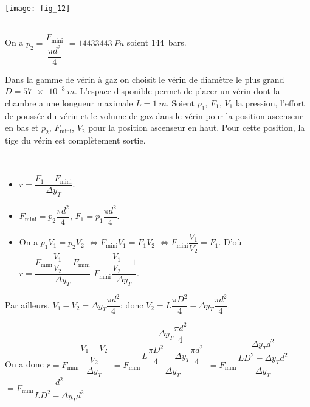 \ifprof
\else
\begin{marginfigure}
\texttt{[image: fig\_12]}
\end{marginfigure}
\fi

\ifprof
\begin{corrige}~\\
On a $p_2 = \dfrac{F_{\text{mini}}}{\dfrac{\pi d^2}{4}}$ $=\SI{14433443}{Pa}$ soient \SI{144}{bars}.
\end{corrige}
\else
\fi

\ifprof
\else
Dans la gamme de vérin à gaz on choisit le vérin de diamètre le plus grand
$D=\SI{57e-3}{m}$. L’espace disponible permet de placer un vérin dont la chambre
a une longueur maximale $L=\SI{1}{m}$. Soient $p_1$, $F_1$, $V_1$ la pression,
l’effort de poussée du vérin et le volume de gaz dans le vérin pour la position
ascenseur en bas et $p_2$, $F_{\text{mini}}$, $V_2$ pour la position ascenseur en haut. Pour cette
position, la tige du vérin est complètement sortie.
\fi


\ifprof
\begin{corrige}~\\
\begin{itemize}
\item $r=\dfrac{F_1-F_{\text{mini}}}{\Delta y_T}$.
\item $F_{\text{mini}}=p_2\dfrac{\pi d^2}{4}$, $F_1=p_1\dfrac{\pi d^2}{4}$.
\item On a $p_1 V_1 = p_2 V_2$  $\Leftrightarrow F_{\text{mini}} V_1 = F_1 V_2$ $\Leftrightarrow F_{\text{mini}} \dfrac{V_1}{V_2} = F_1$. D'où $r=\dfrac{F_{\text{mini}} \dfrac{V_1}{V_2}-F_{\text{mini}}}{\Delta y_T}$
$F_{\text{mini}}\dfrac{ \dfrac{V_1}{V_2}-1}{\Delta y_T}$.
\end{itemize}
Par ailleurs, $V_1-V_2=\Delta y_T \dfrac{\pi d^2}{4}$; donc $V_2 = L\dfrac{\pi D^2}{4}-\Delta y_T \dfrac{\pi d^2}{4}$.

On a donc $r=F_{\text{mini}}\dfrac{ \dfrac{V_1-V_2}{V_2}}{\Delta y_T}$ $ =F_{\text{mini}}\dfrac{ \dfrac{\Delta y_T \dfrac{\pi d^2}{4}}{ L\dfrac{\pi D^2}{4}-\Delta y_T \dfrac{\pi d^2}{4}}}{\Delta y_T}$ 
$ =F_{\text{mini}}\dfrac{ \dfrac{\Delta y_T  d^2}{ L D^2-\Delta y_T d^2}}{\Delta y_T}$ 
$ =F_{\text{mini}}\dfrac{ d^2}{ L D^2-\Delta y_T d^2}$ 
\end{corrige}
\else
\fi

